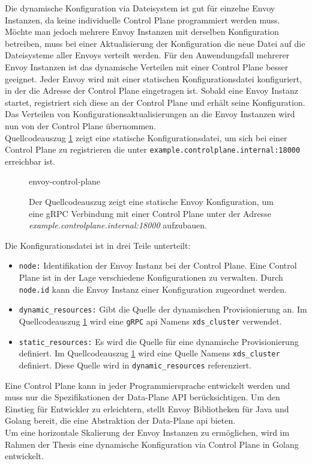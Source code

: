Die dynamische Konfiguration via Dateisystem ist gut für einzelne Envoy Instanzen, da keine individuelle Control Plane programmiert werden muss.
Möchte man jedoch mehrere Envoy Instanzen mit derselben Konfiguration betreiben, muss bei einer Aktualisierung der Konfiguration die neue Datei auf die Dateisysteme aller Envoys verteilt werden.
Für den Anwendungsfall mehrerer Envoy Instanzen ist das dynamische Verteilen mit einer Control Plane besser geeignet. Jeder Envoy wird mit einer statischen Konfigurationsdatei konfiguriert, in der die Adresse der Control Plane eingetragen ist. Sobald eine Envoy Instanz startet, registriert sich diese an der Control Plane und erhält seine Konfiguration. Das Verteilen von Konfigurationsaktualisierungen an die Envoy Instanzen wird nun von der Control Plane übernommen.
\\
Quellcodeauszug \ref{code:envoy-control-plane} zeigt eine statische Konfigurationsdatei, um sich bei einer Control Plane zu registrieren die unter \verb|example.controlplane.internal:18000| erreichbar ist.
\begin{figure}
    {envoy-control-plane}
    \caption{Der Quellcodeauszug zeigt eine statische Envoy Konfiguration, um eine gRPC Verbindung mit einer Control Plane unter der Adresse \textit{example.controlplane.internal:18000} aufzubauen.}
    \label{code:envoy-control-plane}
\end{figure}
Die Konfigurationsdatei ist in drei Teile unterteilt:
\begin{itemize}
  \item \verb|node:| Identifikation der Envoy Instanz bei der Control Plane. Eine Control Plane ist in der Lage verschiedene Konfigurationen zu verwalten. Durch \verb|node.id| kann die Envoy Instanz einer Konfiguration zugeordnet werden.
  \item \verb|dynamic_resources:| Gibt die Quelle der dynamischen Provisionierung an. Im Quellcodeauszug \ref{code:envoy-control-plane} wird eine \verb|gRPC| \ac{api} Namens \verb|xds_cluster| verwendet.
  \item \verb|static_resources:| Es wird die Quelle für eine dynamische Provisionierung definiert. Im Quellcodeauszug \ref{code:envoy-control-plane} wird eine Quelle Namens \verb|xds_cluster| definiert. Diese Quelle wird in \verb|dynamic_resources| referenziert.
\end{itemize}
Eine Control Plane kann in jeder Programmiersprache entwickelt werden und muss nur die Spezifikationen der Data-Plane API \cite{EnvoyproxyDataplaneapi2021} berücksichtigen. Um den Einstieg für Entwickler zu erleichtern, stellt Envoy Bibliotheken für Java und Golang bereit, die eine Abstraktion der Data-Plane \ac{api} bieten.
\\
Um eine horizontale Skalierung der Envoy Instanzen zu ermöglichen, wird im Rahmen der Thesis eine dynamische Konfiguration via Control Plane in Golang entwickelt.

